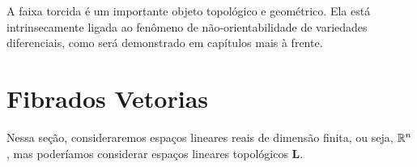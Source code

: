 A faixa torcida é um importante objeto topológico e geométrico. Ela está intrinsecamente ligada ao fenômeno de não-orientabilidade de variedades diferenciais, como será demonstrado em capítulos mais à frente.

\section{Fibrados Vetorias}

Nessa seção, consideraremos espaços lineares reais de dimensão finita, ou seja, $\mathbb{R}^n$, mas poderíamos considerar espaços lineares topológicos $\bm L$.


